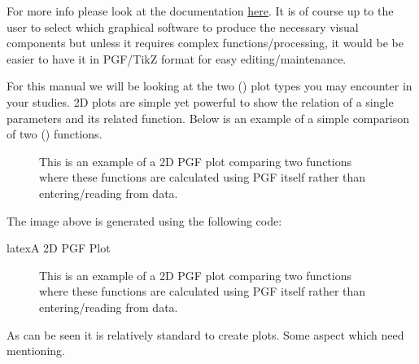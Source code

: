 \documentclass[minted, draw, cover = contour]{../tex/hebdomon}
\begin{document}
For more info please look at the documentation \href{https://tikz.dev/pgfplots/}{here}.
It is of course up to the user to select which graphical software to produce the necessary
visual components but unless it requires complex functions/processing, it would be be easier
to have it in PGF/TikZ format for easy editing/maintenance.

For this manual we will be looking at the two () plot types you may
encounter in your studies.
%
%
2D plots are simple yet powerful to show the relation of a single parameters
and its related function.
Below is an example of a simple comparison of two () functions.
%
\begin{figure}[!ht]
	\centering
	\caption{This is an example of a 2D PGF plot comparing
		two functions where these functions are calculated using
		PGF itself rather than entering/reading from data.}
\end{figure}
%
The image above is generated using the following code:

\begin{Code}{latex}{A 2D PGF Plot}
	\begin{figure}[!ht]
		\centering
		\caption{This is an example of a 2D PGF plot comparing
			two functions where these functions are calculated using
			PGF itself rather than entering/reading from data.}
	\end{figure}
\end{Code}

As can be seen it is relatively standard to create plots. Some aspect
which need mentioning.
\end{document}
